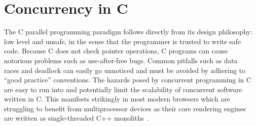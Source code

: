 \section{Concurrency in C}
The C parallel programming paradigm follows directly from its design philosophy: low level and unsafe, in the sense that the programmer is trusted to write safe code. Because C does not check pointer operations, C programs can cause notorious problems such as use-after-free bugs. Common pitfalls such as data races and deadlock can easily go unnoticed and must be avoided by adhering to “good practice” conventions. The hazards posed by concurrent programming in C are easy to run into and potentially limit the scalability of concurrent software written in C. This manifests strikingly in most modern browsers which are struggling to benefit from multiprocessor devices as their core rendering engines are written as single-threaded C++ monoliths~\cite{servo}.